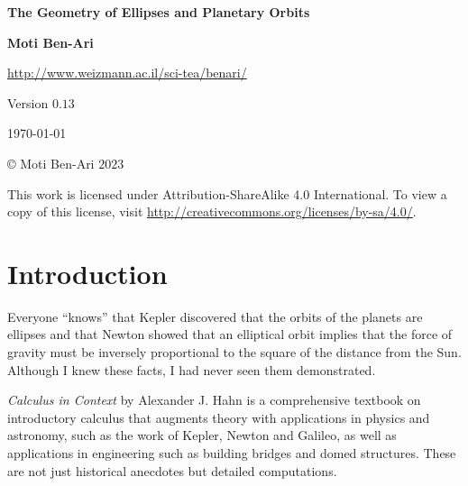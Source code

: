 


\thispagestyle{empty}

\begin{center}
\textbf{\LARGE The Geometry of Ellipses and Planetary Orbits}

\bigskip
\bigskip
\bigskip

\textbf{\Large Moti Ben-Ari}

\bigskip

\url{http://www.weizmann.ac.il/sci-tea/benari/}

\bigskip
\bigskip
\bigskip

Version $0.13$

\bigskip

\today

\end{center}

\vfill

\begin{center}
\copyright{} Moti Ben-Ari $2023$
\end{center}
 
\begin{small}
This work is licensed under Attribution-ShareAlike 4.0 International. To view a copy of this license, visit \url{http://creativecommons.org/licenses/by-sa/4.0/}.
\end{small}

\newpage

\tableofcontents

\newpage


\section{Introduction}

Everyone ``knows'' that Kepler discovered that the orbits of the planets are ellipses and that Newton showed that an elliptical orbit implies that the force of gravity must be inversely proportional to the square of the distance from the Sun. Although I knew these facts, I had never seen them demonstrated.

\textit{Calculus in Context} \cite{hahn-cic} by Alexander J. Hahn is a comprehensive textbook on introductory calculus that augments theory with  applications in physics and astronomy, such as the work of Kepler, Newton and Galileo, as well as applications in engineering such as building bridges and domed structures. These are not just historical anecdotes but detailed computations.

